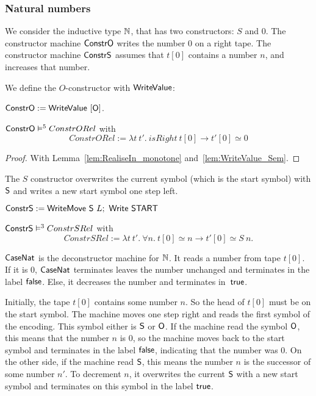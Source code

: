 \subsubsection{Natural numbers}
\label{sec:match-nat}
%

We consider the inductive type $\mathbb{N}$, that has two constructors: $S$ and $0$.  The constructor machine $\MS{ConstrO}$ writes the number $0$ on a
right tape.  The constructor machine $\MS{ConstrS}$ assumes that $t[0]$ contains a number $n$, and increases that number.

We define the $O$-constructor with $\mathsf{WriteValue}$:
\begin{definition}[$\MS{ConstrO}$][Constr_O]
  \label{def:Constr_O}
  $\mathsf{ConstrO} := \mathsf{WriteValue}~[\mathsf{O}]$.
\end{definition}
\begin{lemma}
  \label{lem:Constr_O_Sem}
  $\mathsf{ConstrO} \mathrel{\vDash^{5}} ConstrORel$ with
  \[
    ConstrORel := \lambda t~t'.~isRight~t[0] \rightarrow t'[0] \simeq 0
  \]
\end{lemma}
\begin{proof}
  With Lemma~\ref{lem:RealiseIn_monotone} and~\ref{lem:WriteValue_Sem}.
\end{proof}

The $S$ constructor overwrites the current symbol (which is the start symbol) with $\mathsf{S}$ and writes a new start symbol one step left.
\begin{definition}[$\MS{ConstrS}$][Constr_S]
  $\mathsf{ConstrS} := \mathsf{WriteMove}~\mathsf{S}~L ;~ \mathsf{Write}~\mathsf{START}$
\end{definition}
\begin{lemma}
  $\mathsf{ConstrS} \mathrel{\vDash^{3}} ConstrSRel$ with
  \[
    ConstrSRel := \lambda t~t'.~\forall n.~ t[0] \simeq n \rightarrow t'[0] \simeq S~n.
  \]
\end{lemma}


$\mathsf{CaseNat}$ is the deconstructor machine for $\mathbb{N}$.  It reads a number from tape $t[0]$.  If it is $0$, $\mathsf{CaseNat}$ terminates leaves the
number unchanged and terminates in the label $\mathsf{false}$.  Else, it decreases the number and terminates in~$\mathsf{true}$.

Initially, the tape $t[0]$ contains some number $n$.  So the head of $t[0]$ must be on the start symbol.  The machine moves one step right and reads
the first symbol of the encoding.  This symbol either is $\mathsf{S}$ or $\mathsf{O}$.  If the machine read the symbol $\mathsf{O}$, this means that the number
$n$ is $0$, so the machine moves back to the start symbol and terminates in the label $\mathsf{false}$, indicating that the number was $0$.  On the other
side, if the machine read $\mathsf{S}$, this means the number $n$ is the successor of some number $n'$.  To decrement $n$, it overwrites the current
$\mathsf{S}$ with a new start symbol and terminates on this symbol in the label $\mathsf{true}$.


